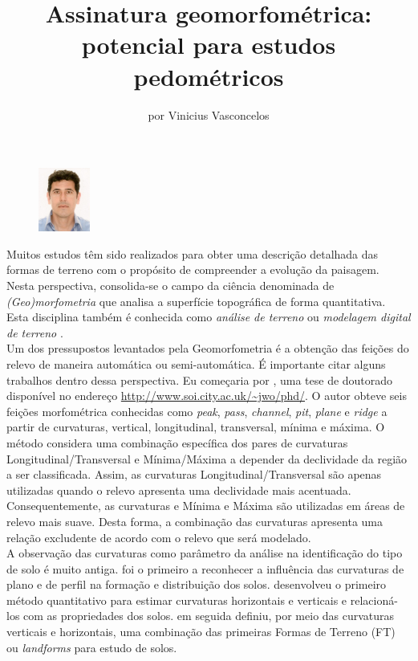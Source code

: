 \title{Assinatura geomorfométrica: potencial para estudos pedométricos}
\author{por Vinicius Vasconcelos}
\maketitle
\begin{figure}
\includegraphics[width=0.15\textwidth]{figuras/foto-vini.jpg}
\end{figure}
Muitos estudos têm sido realizados para obter uma descrição detalhada das formas de terreno com o propósito de compreender a evolução da paisagem. Nesta perspectiva, consolida-se o campo da ciência denominada de \emph{(Geo)morfometria} que analisa a superfície topográfica de forma quantitativa. Esta disciplina também é conhecida como \emph{análise de terreno} ou \emph{modelagem digital de terreno} \citep{LaneEtAl1998, Pike:2000}.\\
Um dos pressupostos levantados pela Geomorfometria é a obtenção das feições do relevo de maneira automática ou semi-automática.  É importante citar alguns trabalhos dentro dessa perspectiva. Eu começaria por \cite{Wood:1996}, uma tese de doutorado disponível no endereço \url{http://www.soi.city.ac.uk/~jwo/phd/}. O autor obteve seis feições morfométrica conhecidas como \emph{peak}, \emph{pass}, \emph{channel}, \emph{pit}, \emph{plane} e \emph{ridge} a partir de curvaturas, vertical, longitudinal, transversal, mínima e máxima.  O método considera uma combinação específica dos pares de curvaturas Longitudinal/Transversal e Mínima/Máxima a depender da declividade da região a ser classificada. Assim, as curvaturas Longitudinal/Transversal são apenas utilizadas quando o relevo apresenta uma declividade mais acentuada. Consequentemente, as curvaturas e Mínima e Máxima são utilizadas em áreas de relevo mais suave. Desta forma, a combinação das curvaturas apresenta uma relação excludente de acordo com o relevo que 
será modelado.\\
A observação das curvaturas como parâmetro da análise na identificação do tipo de solo é muito antiga.  \cite{Aandahl:1948} foi o primeiro a reconhecer a influência das curvaturas de plano e de perfil na formação e distribuição dos solos. \cite{Troeh:1964} desenvolveu o primeiro método quantitativo para estimar curvaturas horizontais e verticais e relacioná-los com as propriedades dos solos. \cite{Pennock:1987} em seguida definiu, por meio das curvaturas verticais e horizontais, uma combinação das primeiras Formas de Terreno (FT) ou \emph{landforms} para estudo de solos.\\
